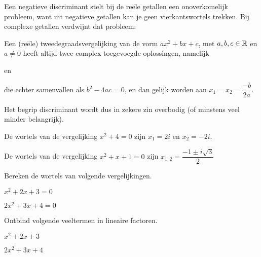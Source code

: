 \documentclass{ximera}
\begin{document}
    Een negatieve discriminant stelt bij de reële getallen een onoverkomelijk probleem, want uit negatieve getallen kan je geen vierkantswortels trekken.
    Bij complexe getallen verdwijnt dat probleem:

    \begin{proposition}\nl

        Een (reële) tweedegraadsvergelijking van de vorm $ax^2+bx+c$, met $a,b,c\in\mathbb{R}$ en $a\neq0$
        heeft altijd twee complex toegevoegde oplossingen, namelijk 
        \begin{center}
             en 
        \end{center}
        die echter samenvallen als $b^2-4ac=0$, en dan gelijk worden aan $x_1=x_2=\dfrac{-b}{2a}$.
    \end{proposition}
    Het begrip discriminant wordt dus in zekere zin overbodig (of minstens veel minder belangrijk).


    \begin{example} 
        \begin{question} De wortels van de vergelijking $x^2+4=0$ zijn $x_1=2i$ en $x_2=-2i$.\end{question}
        \begin{question} De wortels van de vergelijking $x^2+x+1=0$ zijn $x_{1,2}=\dfrac{-1\pm i\sqrt{3}}{2}$\end{question}
    \end{example}

    \begin{exercise} Bereken de wortels van volgende vergelijkingen.
        \begin{question} $x^2+2x+3=0$\end{question}
        \begin{question} $2x^2+3x+4=0$\end{question}
    \end{exercise}

    \begin{exercise} Ontbind volgende veeltermen in lineaire factoren.
        \begin{question} $x^2+2x+3$\end{question}
        \begin{question} $2x^2+3x+4$\end{question}
    \end{exercise}
\end{document}
